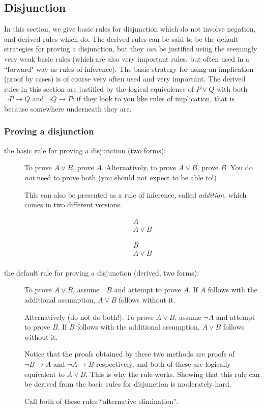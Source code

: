 \documentclass[12pt]{article}
\begin{document}
\subsection{Disjunction}

In this section, we give basic rules for disjunction which do not involve negation, and derived rules which do.  The derived rules can be said to be the default strategies for proving a disjunction, but they {\em can\/} be justified using the seemingly very weak basic rules (which are also very important rules, but often used in a ``forward" way as rules of inference).   The basic strategy for using an implication (proof by cases) is of course very often used and very important.  The derived rules in this section are justified by the logical equivalence of $P \vee Q$ with both $\neg P \rightarrow Q$ and $\neg Q \rightarrow P$:  if they look to you like rules of implication, that is because somewhere underneath they are.

\subsubsection{Proving a disjunction}

\begin{description}

\item[the basic rule for proving a disjunction (two forms):]  To prove $A \vee B$, prove $A$.   Alternatively, to prove $A \vee B$, prove $B$.
You do {\em not\/} need to prove both (you should not expect to be able to!)

This can also be presented as a rule of inference, called {\em addition\/}, which comes in two different versions.

$$\begin{array}{r} A \\ \hline A \vee B \end{array}$$

$$\begin{array}{r} B \\ \hline  A \vee B \\ \end{array}$$

\item[the default rule for proving a disjunction (derived, two forms):]   To prove $A \vee B$, assume $\neg B$ and attempt to prove $A$.  If $A$ follows with the additional assumption, $A \vee B$ follows without it.  

Alternatively (do not do both!):  To prove $A \vee B$, assume $\neg A$ and attempt to prove $B$.  If $B$ follows with the additional assumption, $A \vee B$ follows without it.

Notice that the proofs obtained by these two methods are proofs of $\neg B \rightarrow A$ and $\neg A \rightarrow B$ respectively, and both of these are logically equivalent to $A \vee B$.  This is why the rule works.  Showing that this rule can be derived from the basic rules for disjunction is moderately hard.

Call both of these rules  ``alternative elimination".


\end{description}
\end{document}
